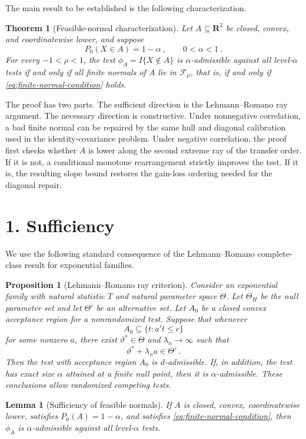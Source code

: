 \documentclass[12pt]{article}
\newtheorem{theorem}{Theorem}
\newtheorem{proposition}{Proposition}
\newtheorem{lemma}{Lemma}
\theoremstyle{remark}
\begin{document}
The main result to be established is the following characterization.

\begin{theorem}[Feasible-normal characterization]\label{thm:iff}
Let $A\subseteq\mathbf R^2$ be closed, convex, and coordinatewise lower, and suppose
\[
P_0(X\in A)=1-\alpha~,
\qquad 0<\alpha<1~.
\]
For every $-1<\rho<1$, the test $\phi_A=I\{X\notin A\}$ is
$\alpha$-admissible against all level-$\alpha$ tests if and only if all finite
normals of $A$ lie in $\mathcal F_\rho$, that is, if and only if
\eqref{eq:finite-normal-condition} holds.
\end{theorem}

The proof has two parts.  The sufficient direction is the Lehmann--Romano ray
argument.  The necessary direction is constructive.  Under nonnegative
correlation, a bad finite normal can be repaired by the same hull and diagonal
calibration used in the identity-covariance problem.  Under negative
correlation, the proof first checks whether $A$ is lower along the second
extreme ray of the transfer order.  If it is not, a conditional monotone
rearrangement strictly improves the test.  If it is, the resulting slope bound
restores the gain-loss ordering needed for the diagonal repair.

\section*{1. Sufficiency}

We use the following standard consequence of the Lehmann--Romano complete-class
result for exponential families.

\begin{proposition}[Lehmann--Romano ray criterion]\label{prop:LR}
Consider an exponential family with natural statistic $T$ and natural parameter
space $\Theta$.  Let $\Theta_H$ be the null parameter set and let $\Theta'$ be
an alternative set.  Let $A_0$ be a closed convex acceptance region for a
nonrandomized test.  Suppose that whenever
\[
A_0\subseteq\{t:a't\le c\}
\]
for some nonzero $a$, there exist $\vartheta^*\in\Theta$ and
$\lambda_n\to\infty$ such that
\[
\vartheta^*+\lambda_n a\in\Theta'~.
\]
Then the test with acceptance region $A_0$ is $d$-admissible.  If, in addition,
the test has exact size $\alpha$ attained at a finite null point, then it is
$\alpha$-admissible.  These conclusions allow randomized competing tests.
\end{proposition}

\begin{lemma}[Sufficiency of feasible normals]\label{lem:sufficiency}
If $A$ is closed, convex, coordinatewise lower, satisfies
$P_0(A)=1-\alpha$, and satisfies \eqref{eq:finite-normal-condition}, then
$\phi_A$ is $\alpha$-admissible against all level-$\alpha$ tests.
\end{lemma}
\end{document}
